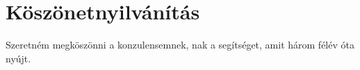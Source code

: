 \chapter*{Köszönetnyilvánítás}

Szeretném megköszönni a konzulensemnek, \vikkonzulens nak a segítséget, amit három félév óta nyújt.